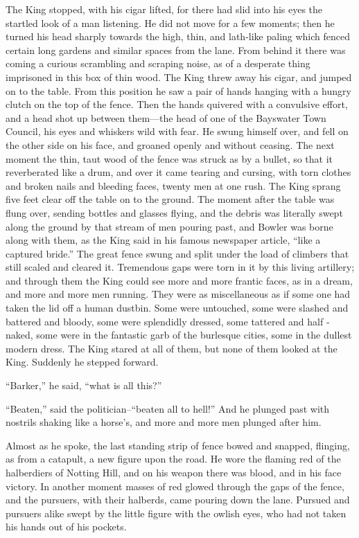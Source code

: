 \documentclass{book}
\begin{document}
The King stopped, with his cigar lifted, for there had slid into his eyes the startled look of a man listening. He did not move for a few moments; then he turned his head sharply towards the high, thin, and lath-like paling which fenced certain long gardens and similar spaces from the lane. From behind it there was coming a curious scrambling and scraping noise, as of a desperate thing imprisoned in this box of thin wood. The King threw away his cigar, and jumped on to the table. From this position he saw a pair of hands hanging with a hungry clutch on the top of the fence. Then the hands quivered with a convulsive effort, and a head shot up between them—the head of one of the Bayswater Town Council, his eyes and whiskers wild with fear. He swung himself over, and fell on the other side on his face, and groaned openly and without ceasing. The next moment the thin, taut wood of the fence was struck as by a bullet, so that it reverberated like a drum, and over it came tearing and cursing, with torn clothes and broken nails and bleeding faces, twenty men at one rush. The King sprang five feet clear off the table on to the ground. The moment after the table was flung over, sending bottles and glasses flying, and the debris was literally swept along the ground by that stream of men pouring past, and Bowler was borne along with them, as the King said in his famous newspaper article, “like a captured bride.” The great fence swung and split under the load of climbers that still scaled and cleared it. Tremendous gaps were torn in it by this living artillery; and through them the King could see more and more frantic faces, as in a dream, and more and more men running. They were as miscellaneous as if some one had taken the lid off a human dustbin. Some were untouched, some were slashed and battered and bloody, some were splendidly dressed, some tattered and half -naked, some were in the fantastic garb of the burlesque cities, some in the dullest modern dress. The King stared at all of them, but none of them looked at the King. Suddenly he stepped forward.

“Barker,” he said, “what is all this?”

“Beaten,” said the politician–“beaten all to hell!” And he plunged past with nostrils shaking like a horse’s, and more and more men plunged after him.

Almost as he spoke, the last standing strip of fence bowed and snapped, flinging, as from a catapult, a new figure upon the road. He wore the flaming red of the halberdiers of Notting Hill, and on his weapon there was blood, and in his face victory. In another moment masses of red glowed through the gaps of the fence, and the pursuers, with their halberds, came pouring down the lane. Pursued and pursuers alike swept by the little figure with the owlish eyes, who had not taken his hands out of his pockets.
\end{document}

